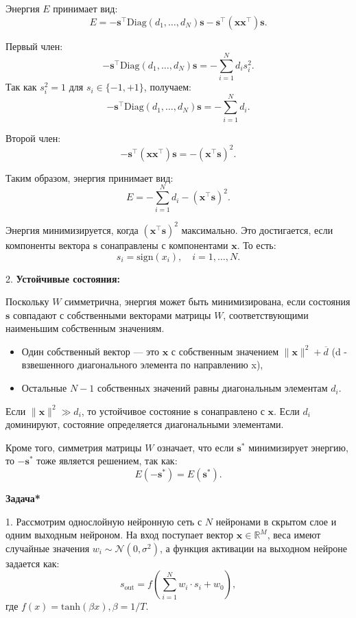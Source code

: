 \begin{description}
Энергия \( E \) принимает вид:
\[
E = -\mathbf{s}^\top \text{Diag}(d_1, \dots, d_N) \mathbf{s} - \mathbf{s}^\top (\mathbf{x} \mathbf{x}^\top) \mathbf{s}.
\]

Первый член:
\[
-\mathbf{s}^\top \text{Diag}(d_1, \dots, d_N) \mathbf{s} = -\sum_{i=1}^N d_i s_i^2.
\]
Так как \( s_i^2 = 1 \) для \( s_i \in \{-1, +1\} \), получаем:
\[
-\mathbf{s}^\top \text{Diag}(d_1, \dots, d_N) \mathbf{s} = -\sum_{i=1}^N d_i.
\]

Второй член:
\[
-\mathbf{s}^\top (\mathbf{x} \mathbf{x}^\top) \mathbf{s} = -(\mathbf{x}^\top \mathbf{s})^2.
\]

Таким образом, энергия принимает вид:
\[
E = -\sum_{i=1}^N d_i - (\mathbf{x}^\top \mathbf{s})^2.
\]

Энергия минимизируется, когда \( (\mathbf{x}^\top \mathbf{s})^2 \) максимально. Это достигается, если компоненты вектора \( \mathbf{s} \) сонаправлены с компонентами \( \mathbf{x} \). То есть:
\[
s_i = \text{sign}(x_i), \quad i = 1, \dots, N.
\]

2. \textbf{Устойчивые состояния:}

Поскольку \( W \) симметрична, энергия может быть минимизирована, если состояния \( \mathbf{s} \) совпадают с собственными векторами матрицы \( W \), соответствующими наименьшим собственным значениям.

\begin{itemize}
    \item Один собственный вектор — это \( \mathbf{x} \) с собственным значением \( \|\mathbf{x}\|^2  + \overline{d}\) (d - взвешенного диагонального элемента по направлению x),
    \item Остальные \( N-1 \) собственных значений равны диагональным элементам \( d_i \).
\end{itemize}

Если \( \|\mathbf{x}\|^2 \gg d_i \), то устойчивое состояние \( \mathbf{s} \) сонаправлено с \( \mathbf{x} \). Если \( d_i \) доминируют, состояние определяется диагональными элементами.

Кроме того, симметрия матрицы \( W \) означает, что если \( \mathbf{s}^* \) минимизирует энергию, то \( -\mathbf{s}^* \) тоже является решением, так как:
\[
E(-\mathbf{s}^*) = E(\mathbf{s}^*).
\]

\textbf{Задача*} 

1. Рассмотрим однослойную нейронную сеть с \( N \) нейронами в скрытом слое и одним выходным нейроном. На вход поступает вектор \( \mathbf{x} \in \mathbb{R}^M \), веса имеют случайные значения \( w_i \sim \mathcal{N}(0, \sigma^2) \), а функция активации на выходном нейроне задается как:
   \[
   s_\text{out} = f\left( \sum_{i=1}^N w_i \cdot s_i + w_0 \right),
   \]
   где \( f(x) = \mathrm{tanh}(\beta x), \beta = 1/T \).


\end{description}
